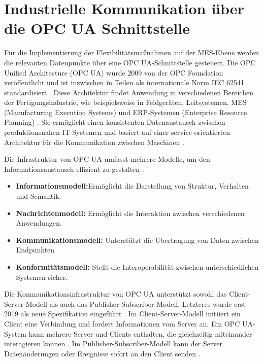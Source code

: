 \section{Industrielle Kommunikation über die OPC UA Schnittstelle}
\label{ch_03Industrielle Kommunikation über die OPC UA Schnittstelle}

Für die Implementierung der Flexibilitätsmaßnahmen auf der MES-Ebene werden die relevanten Datenpunkte über eine OPC UA-Schnittstelle gesteuert. Die OPC Unified Architecture (OPC UA) wurde 2009 von der OPC Foundation veröffentlicht und ist inzwischen in Teilen als internationale Norm IEC 62541 \cite{OPCUnifiedArchitecture2011} standardisiert \cite{ensteOPCUnifiedArchitecture2011}. Diese Architektur findet Anwendung in verschiedenen Bereichen der Fertigungsindustrie, wie beispielsweise in Feldgeräten, Leitsystemen, MES (Manufacturing Execution Systems) und ERP-Systemen (Enterprise Resource Planning) \cite{ensteOPCUnifiedArchitecture2011}. Sie ermöglicht einen konsistenten Datenaustausch zwischen produktionsnahen IT-Systemen und basiert auf einer service-orientierten Architektur für die Kommunikation zwischen Maschinen \cite{ensteOPCUnifiedArchitecture2011}.

Die Infrastruktur von OPC UA umfasst mehrere Modelle, um den Informationsaustausch effizient zu gestalten \cite{OPCUnifiedArchitecture2011}:

\begin{itemize}[label={--}]
	\item \textbf{Informationsmodell:}Ermöglicht die Darstellung von Struktur, Verhalten und Semantik.
	\item \textbf{Nachrichtenmodell:} Ermöglicht die Interaktion zwischen verschiedenen Anwendungen.
	\item \textbf{Kommunikationsmodell:} Unterstützt die Übertragung von Daten zwischen Endpunkten
	\item \textbf{Konformitätsmodell:} Stellt die Interoperabilität zwischen unterschiedlichen Systemen sicher.
\end{itemize}

Die Kommunikationsinfrastruktur von OPC UA unterstützt sowohl das Client-Server-Modell als auch das Publisher-Subscriber-Modell. Letzteres wurde erst 2019 als neue Spezifikation eingeführt \cite{dkedeutschekommissionelektrotechnikelektronikinformationstechnikindinundvdeOPCUnifiedArchitecture2021}. Im Client-Server-Modell initiiert ein Client eine Verbindung und fordert Informationen vom Server an. Ein OPC UA-System kann mehrere Server und Clients enthalten, die gleichzeitig miteinander interagieren können \cite{profanterOPCUAROS2019}. Im Publisher-Subscriber-Modell kann der Server Datenänderungen oder Ereignisse sofort an den Client senden \cite{deveciThoroughAnalysisComparison2022}.\\

